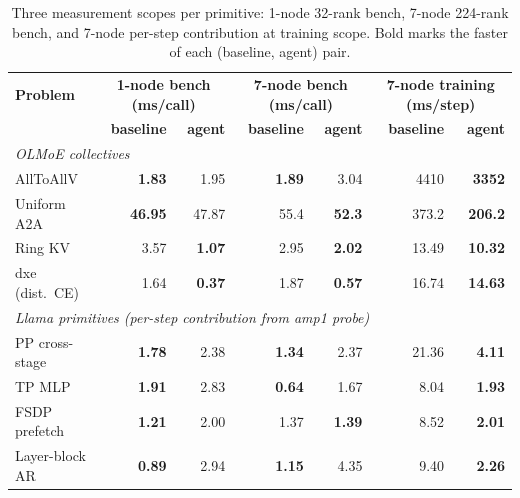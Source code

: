 \begin{table}[t]
\centering\small
\setlength{\tabcolsep}{4pt}
\begin{tabular}{lrrrrrr}
\toprule
\textbf{Problem} & \multicolumn{2}{c}{\textbf{1-node bench (ms/call)}} & \multicolumn{2}{c}{\textbf{7-node bench (ms/call)}} & \multicolumn{2}{c}{\textbf{7-node training (ms/step)}} \\
                 & \textbf{baseline} & \textbf{agent} & \textbf{baseline} & \textbf{agent} & \textbf{baseline} & \textbf{agent} \\
\midrule
\multicolumn{7}{l}{\textit{OLMoE collectives}} \\
AllToAllV       & \textbf{1.83} & 1.95 & \textbf{1.89} & 3.04 & 4410 & \textbf{3352} \\
Uniform A2A     & \textbf{46.95} & 47.87 & 55.4 & \textbf{52.3} & 373.2 & \textbf{206.2} \\
Ring KV         & 3.57 & \textbf{1.07} & 2.95 & \textbf{2.02} & 13.49 & \textbf{10.32} \\
dxe (dist.\ CE) & 1.64 & \textbf{0.37} & 1.87 & \textbf{0.57} & 16.74 & \textbf{14.63} \\
\midrule
\multicolumn{7}{l}{\textit{Llama primitives (per-step contribution from amp1 probe)}} \\
PP cross-stage  & \textbf{1.78} & 2.38 & \textbf{1.34} & 2.37 & 21.36 & \textbf{4.11} \\
TP MLP          & \textbf{1.91} & 2.83 & \textbf{0.64} & 1.67 & 8.04 & \textbf{1.93} \\
FSDP prefetch   & \textbf{1.21} & 2.00 & 1.37 & \textbf{1.39} & 8.52 & \textbf{2.01} \\
Layer-block AR  & \textbf{0.89} & 2.94 & \textbf{1.15} & 4.35 & 9.40 & \textbf{2.26} \\
\bottomrule
\end{tabular}
\caption{Three measurement scopes per primitive: 1-node 32-rank bench, 7-node 224-rank bench, and 7-node
per-step contribution at training scope. Bold marks the faster of each (baseline, agent) pair.}
\label{tab:perproblem}
\end{table}

